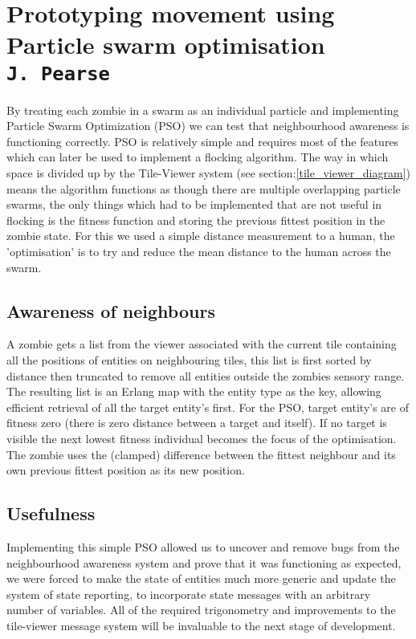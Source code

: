\pagestyle{empty}

\section{Prototyping movement using Particle swarm optimisation\\{\small\tt{J.~Pearse}}}
\label{pso}
By treating each zombie in a swarm as an individual particle and implementing Particle Swarm Optimization (PSO) we can test that neighbourhood awareness is functioning correctly. PSO is relatively simple and requires most of the features which can later be used to implement a flocking algorithm. The way in which space is divided up by the Tile-Viewer system (see section:\ref{tile_viewer_diagram}) means the algorithm functions as though there are multiple overlapping particle swarms, the only things which had to be implemented that are not useful in flocking is the fitness function and storing the previous fittest position in the zombie state. For this we used a simple distance measurement to a human, the 'optimisation' is to try and reduce the mean distance to the human across the swarm. 

\subsection{Awareness of neighbours}
A zombie gets a list from the viewer associated with the current tile containing all the positions of entities on neighbouring tiles, this list is first sorted by distance  then truncated to remove all entities outside the zombies sensory range. The resulting list is an Erlang map with the entity type as the key, allowing efficient retrieval of all the target entity’s first. For the PSO, target entity's are of fitness zero (there is zero distance between a target and itself). If no target is visible the next lowest fitness individual becomes the focus of the optimisation. The zombie uses the (clamped) difference between the fittest neighbour and its own previous fittest position as its new position.

\subsection{Usefulness}
Implementing this simple PSO allowed us to uncover and remove bugs from the neighbourhood awareness system and prove that it was functioning as expected, we were forced to make the state of entities much more generic and update the system of state reporting, to incorporate state messages with an arbitrary number of variables. All of the required trigonometry and improvements to the tile-viewer message system will be invaluable to the next stage of development.

